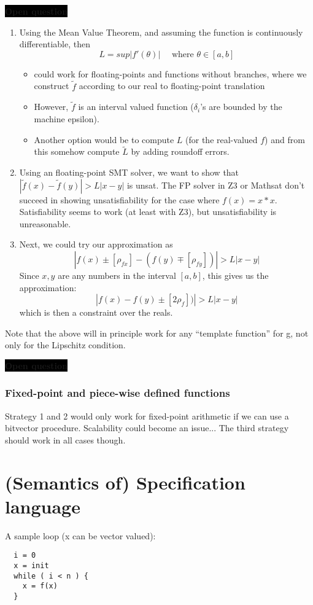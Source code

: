 \documentclass[10pt]{article}
\newcommand{\openquestion}[1]{
 {\bf \colorbox{black}{{\color{orange}Open question}}} \fbox{#1}
  }
\begin{document}
\openquestion{}
\begin{enumerate}
\item Using the Mean Value Theorem, and assuming the function is continuously differentiable, then
$$
L = sup |f'(\theta)| \quad \text{ where } \theta \in [a, b]
$$
\begin{itemize}
\item could work for floating-points and functions without branches, where we construct $\tilde{f}$ according to
our real to floating-point translation
\item However, $\tilde{f}$ is an interval valued function ($\delta_i$'s are bounded
by the machine epsilon).
\item Another option would be to compute $L$ (for the real-valued $f$) and from this somehow compute $\tilde{L}$
by adding roundoff errors.
\end{itemize}


\item Using an floating-point SMT solver, we want to show that
$
|\tilde{f}(x) - \tilde{f}(y)| > L |x - y|
$
is unsat. The FP solver in Z3 or Mathsat don't succeed in showing unsatisfiability for the case where
$f(x) = x*x$. Satisfiability seems to work (at least with Z3), but unsatisfiability is unreasonable.


\item Next, we could try our approximation as
$$
|f(x) \pm [\rho_{fx}] - (f(y) \mp [\rho_{fy}])| > L |x - y|
$$
Since $x, y$ are any numbers in the interval $[a, b]$, this gives us the approximation:
$$
|f(x) - f(y) \pm [2\rho_{f}])| > L |x - y|
$$
which is then a constraint over the reals.
\end{enumerate}

Note that the above will in principle work for any ``template function'' for g, not only for the Lipschitz
condition.
\openquestion{which template is reasonable?}


\subsubsection{Fixed-point and piece-wise defined functions}
Strategy 1 and 2 would only work for fixed-point arithmetic if we can use a bitvector procedure.
Scalability could become an issue...
The third strategy should work in all cases though.


\section{(Semantics of) Specification language}
A sample loop (x can be vector valued):
\begin{lstlisting}
  i = 0
  x = init
  while ( i < n ) {
    x = f(x)
  }
\end{lstlisting}
\end{document}
